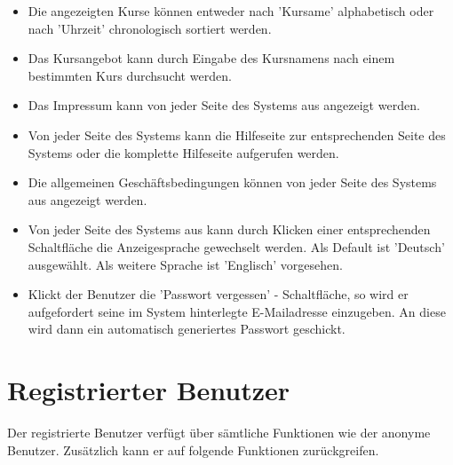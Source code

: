 \documentclass[a4paper]{scrreprt}
\newcounter{Lc}
\newcounter{Hc}
\newcommand{\stepHc}{\stepcounter{Hc}\setcounter{Lc}{0}}
\begin{document}
\begin{itemize}
	\item {}
	Die angezeigten Kurse können entweder nach 'Kursame' alphabetisch oder nach 'Uhrzeit' chronologisch sortiert werden.
	\item {}
	Das Kursangebot kann durch Eingabe des Kursnamens nach einem bestimmten Kurs durchsucht werden.
	\item {}
	Das Impressum kann von jeder Seite des Systems aus angezeigt werden.
	\item {}
	Von jeder Seite des Systems kann die Hilfeseite zur entsprechenden Seite des Systems oder die komplette Hilfeseite aufgerufen werden.
	\item {}
	Die allgemeinen Geschäftsbedingungen können von jeder Seite des Systems aus angezeigt werden.
	\item {}
	Von jeder Seite des Systems aus kann durch Klicken einer entsprechenden Schaltfläche die Anzeigesprache gewechselt werden. Als Default ist 'Deutsch' ausgewählt. Als weitere Sprache ist 'Englisch' vorgesehen. 
	\item {}
	Klickt der Benutzer die 'Passwort vergessen' - Schaltfläche, so wird er aufgefordert seine im System hinterlegte E-Mailadresse einzugeben. An diese wird dann ein automatisch generiertes Passwort geschickt.
\end{itemize}

\section{Registrierter Benutzer}
Der registrierte Benutzer verfügt über sämtliche Funktionen wie der anonyme Benutzer. Zusätzlich kann er auf folgende Funktionen zurückgreifen.
\stepHc
\end{document}
